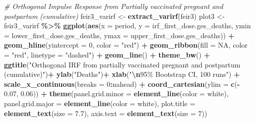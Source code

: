 \documentclass[
]{article}
\newenvironment{Shaded}{\begin{snugshade}}{\end{snugshade}}
\newcommand{\AttributeTok}[1]{\textcolor[rgb]{0.13,0.29,0.53}{#1}}
\newcommand{\CommentTok}[1]{\textcolor[rgb]{0.56,0.35,0.01}{\textit{#1}}}
\newcommand{\ConstantTok}[1]{\textcolor[rgb]{0.56,0.35,0.01}{#1}}
\newcommand{\DecValTok}[1]{\textcolor[rgb]{0.00,0.00,0.81}{#1}}
\newcommand{\FloatTok}[1]{\textcolor[rgb]{0.00,0.00,0.81}{#1}}
\newcommand{\FunctionTok}[1]{\textcolor[rgb]{0.13,0.29,0.53}{\textbf{#1}}}
\newcommand{\NormalTok}[1]{#1}
\newcommand{\OtherTok}[1]{\textcolor[rgb]{0.56,0.35,0.01}{#1}}
\newcommand{\SpecialCharTok}[1]{\textcolor[rgb]{0.81,0.36,0.00}{\textbf{#1}}}
\newcommand{\StringTok}[1]{\textcolor[rgb]{0.31,0.60,0.02}{#1}}
\renewenvironment{Shaded}{\begin{mdframed}[ backgroundcolor=shadecolor, linecolor = shadecolor, leftmargin=\dimexpr\leftmargin-2pt\relax, innerleftmargin=1.6pt, innertopmargin=5pt, skipabove=10pt,skipbelow=3pt ]}{\end{mdframed}}
\begin{document}
\begin{Shaded}
\begin{Highlighting}[]
\CommentTok{\# Orthogonal Impulse Response from Partially vaccinated pregnant and postpartum (cumulative)}
\NormalTok{feir3\_varirf }\OtherTok{\textless{}{-}} \FunctionTok{extract\_varirf}\NormalTok{(feir3)}
\NormalTok{plot3 }\OtherTok{\textless{}{-}}\NormalTok{ feir3\_varirf }\SpecialCharTok{\%\textgreater{}\%} 
  \FunctionTok{ggplot}\NormalTok{(}\FunctionTok{aes}\NormalTok{(}\AttributeTok{x =}\NormalTok{ period, }
             \AttributeTok{y =}\NormalTok{ irf\_first\_dose.ges\_deaths, }
             \AttributeTok{ymin =}\NormalTok{ lower\_first\_dose.ges\_deaths, }
             \AttributeTok{ymax =}\NormalTok{ upper\_first\_dose.ges\_deaths)) }\SpecialCharTok{+}
  \FunctionTok{geom\_hline}\NormalTok{(}\AttributeTok{yintercept =} \DecValTok{0}\NormalTok{, }\AttributeTok{color =} \StringTok{"red"}\NormalTok{) }\SpecialCharTok{+}
  \FunctionTok{geom\_ribbon}\NormalTok{(}\AttributeTok{fill =} \ConstantTok{NA}\NormalTok{, }
              \AttributeTok{color =} \StringTok{"red"}\NormalTok{,}
              \AttributeTok{linetype =} \StringTok{"dashed"}\NormalTok{) }\SpecialCharTok{+}
  \FunctionTok{geom\_line}\NormalTok{() }\SpecialCharTok{+}
  \FunctionTok{theme\_bw}\NormalTok{() }\SpecialCharTok{+}
  \FunctionTok{ggtitle}\NormalTok{(}\StringTok{"Orthogonal IRF from partially vaccinated pregnant and postpartum (cumulative)"}\NormalTok{)}\SpecialCharTok{+}
  \FunctionTok{ylab}\NormalTok{(}\StringTok{"Deaths"}\NormalTok{)}\SpecialCharTok{+}
  \FunctionTok{xlab}\NormalTok{(}\StringTok{"}\SpecialCharTok{\textbackslash{}n}\StringTok{95\% Bootstrap CI, 100 runs"}\NormalTok{) }\SpecialCharTok{+} 
  \FunctionTok{scale\_x\_continuous}\NormalTok{(}\AttributeTok{breaks =} \DecValTok{0}\SpecialCharTok{:}\NormalTok{nahead) }\SpecialCharTok{+}
  \FunctionTok{coord\_cartesian}\NormalTok{(}\AttributeTok{ylim =} \FunctionTok{c}\NormalTok{(}\SpecialCharTok{{-}} \FloatTok{0.07}\NormalTok{, }\FloatTok{0.06}\NormalTok{)) }\SpecialCharTok{+}
  \FunctionTok{theme}\NormalTok{(}\AttributeTok{panel.grid.minor =} \FunctionTok{element\_line}\NormalTok{(}\AttributeTok{color =} \StringTok{\textquotesingle{}white\textquotesingle{}}\NormalTok{),}
        \AttributeTok{panel.grid.major =} \FunctionTok{element\_line}\NormalTok{(}\AttributeTok{color =} \StringTok{\textquotesingle{}white\textquotesingle{}}\NormalTok{),}
        \AttributeTok{plot.title =} \FunctionTok{element\_text}\NormalTok{(}\AttributeTok{size =} \FloatTok{7.7}\NormalTok{),}
        \AttributeTok{axis.text =} \FunctionTok{element\_text}\NormalTok{(}\AttributeTok{size =} \DecValTok{7}\NormalTok{))}


\end{Highlighting}
\end{Shaded}
\end{document}
